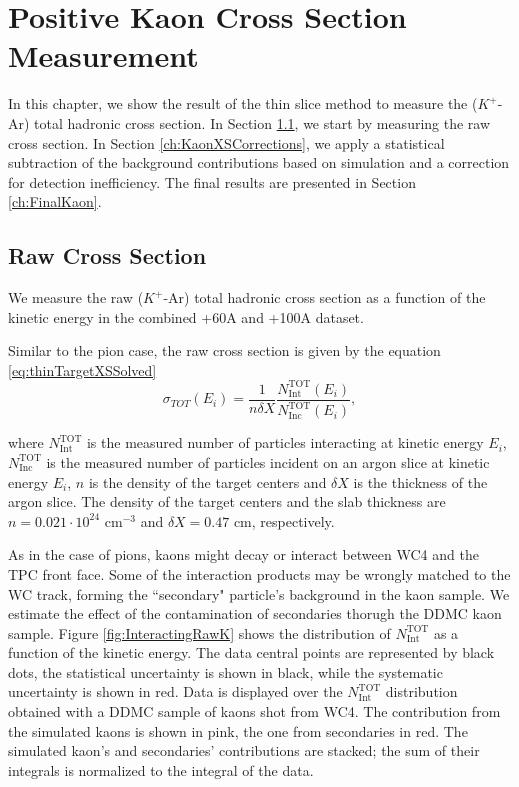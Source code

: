 \chapter{Positive Kaon Cross Section Measurement}\label{ch:KaonXS}

In this chapter, we show the result of the thin slice method to measure  the ($K^+$-Ar) total hadronic cross section. In Section \ref{ch:KaonXSRaw}, we start by measuring the raw cross section. In Section \ref{ch:KaonXSCorrections}, we apply a statistical subtraction of the background contributions based on simulation and a correction for detection inefficiency. The final results are presented in Section \ref{ch:FinalKaon}.


\section{Raw Cross Section}\label{ch:KaonXSRaw}
We measure the raw ($K^+$-Ar) total hadronic cross section as a function of the kinetic energy in the combined +60A and +100A dataset. 

Similar to the pion case,  the raw cross section is given by the equation \ref{eq:thinTargetXSSolved}
\begin{equation}
 \sigma_{TOT} (E_i)  = \frac{1}{n \delta X}\frac{N^{\text{TOT}}_{\text{Int}}(E_i)}{N^{\text{TOT}}_{\text{Inc}}(E_i)},
\end{equation}

where $N^{\text{TOT}}_{\text{Int}}$  is the measured number of particles interacting at kinetic energy $E_i$, $N^{\text{TOT}}_{\text{Inc}}$ is the  measured  number of particles incident  on an argon slice at  kinetic energy $E_i$,  $n$ is the density of the target centers  and $\delta X$ is the thickness of the argon slice. The density of the target centers and the slab thickness are $n = 0.021\cdot10^{24} \text{ cm}^{-3} $ and  $\delta X=0.47\text{ cm}$, respectively.


As in the case of pions, kaons might decay or interact between WC4 and the TPC front face. Some of the interaction products may be wrongly matched to the WC track, forming the ``secondary" particle's background in the kaon sample. We estimate the effect of the contamination of secondaries thorugh the DDMC kaon sample.
Figure \ref{fig:InteractingRawK} shows the distribution of  $N^{\text{TOT}}_{\text{Int}}$  as a function of the kinetic energy. The data central points are represented by black dots, the statistical uncertainty is shown in black, while the systematic uncertainty is shown in red. Data is displayed over the $N^{\text{TOT}}_{\text{Int}}$  distribution obtained with a DDMC  sample of kaons shot from WC4.  
The contribution from the simulated kaons is shown in pink, the one from secondaries in red. The simulated kaon's and secondaries' contributions are stacked; the sum of their integrals is normalized to the integral of the data.
 
